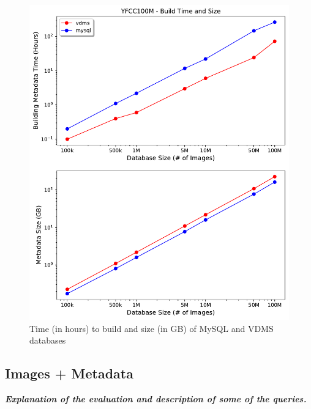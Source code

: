 \begin{figure}[]
\centering
\includegraphics[width=\columnwidth]{figures/db_time_size}
\caption{Time (in hours) to build and size (in GB) of MySQL and VDMS databases}
\label{fig:db_time_size}
\end{figure}


\subsection{Images + Metadata}

\textbf{\textit{Explanation of the evaluation and description of some of the queries.}}


